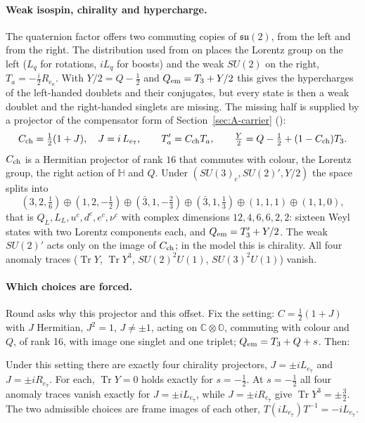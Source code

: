\paragraph{Weak isospin, chirality and hypercharge.}
The quaternion factor offers two commuting copies of $\mathfrak{su}(2)$, from the left and from the right. The distribution
used from  on places the Lorentz group on the left ($L_q$ for rotations, $iL_q$ for boosts) and the weak
$SU(2)$ on the right, $T_a=-\tfrac i2R_{e_a}$. With $Y/2=Q-\tfrac12$ and $Q_{\rm em}=T_3+Y/2$ this gives the hypercharges of
the left-handed doublets and their conjugates, but every state is then a weak doublet and the right-handed singlets are
missing. The missing half is supplied by a projector of the compensator form of Section~\ref{sec:A-carrier} ():
\begin{equation}
 C_{\rm ch}=\tfrac12(1+J),\quad J=i\,L_{e_7},\qquad
 T_a'=C_{\rm ch}T_a,\qquad
 \tfrac Y2=Q-\tfrac12+(1-C_{\rm ch})T_3 .
 \label{eq:B-chirality}
\end{equation}
$C_{\rm ch}$ is a Hermitian projector of rank $16$ that commutes with colour, the Lorentz group, the right action of $\mathbb H$
and $Q$. Under $(SU(3)_c,SU(2)',Y/2)$ the space splits into
\begin{equation}
 (3,2,\tfrac16)\oplus(1,2,-\tfrac12)\oplus(\bar3,1,-\tfrac23)\oplus(\bar3,1,\tfrac13)\oplus(1,1,1)\oplus(1,1,0),
 \label{eq:B-content}
\end{equation}
that is $Q_L,L_L,u^c,d^c,e^c,\nu^c$ with complex dimensions $12,4,6,6,2,2$: sixteen Weyl states with two Lorentz
components each, and $Q_{\rm em}=T_3'+Y/2$. The weak $SU(2)'$ acts only on the image of $C_{\rm ch}$; in the model this is
chirality. All four anomaly traces ($\operatorname{Tr}Y$, $\operatorname{Tr}Y^3$, $SU(2)^2U(1)$, $SU(3)^2U(1)$) vanish.

\paragraph{Which choices are forced.}
Round  asks why this projector and this offset. Fix the setting: $C=\tfrac12(1+J)$ with $J$ Hermitian,
$J^2=1$, $J\neq\pm1$, acting on $\mathbb C\otimes\mathbb O$, commuting with colour and $Q$, of rank 16, with image one
singlet and one triplet; $Q_{\rm em}=T_3+Q+s$. Then:

\begin{proposition}[\rndold{r43}]\label{prop:B-anomaly-choice}
Under this setting there are exactly four chirality projectors, $J=\pm iL_{e_7}$ and $J=\pm iR_{e_7}$. For each,
$\operatorname{Tr}Y=0$ holds exactly for $s=-\tfrac12$. At $s=-\tfrac12$ all four anomaly traces vanish exactly for
$J=\pm iL_{e_7}$, while $J=\pm iR_{e_7}$ give $\operatorname{Tr}Y^3=\pm\tfrac32$. The two admissible choices are frame images
of each other, $T(iL_{e_7})T^{-1}=-iL_{e_7}$.
\end{proposition}

